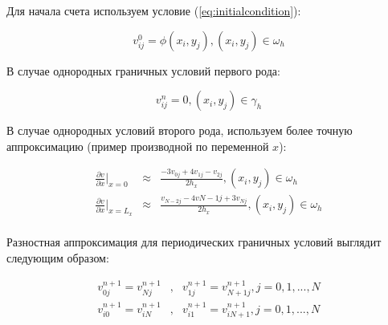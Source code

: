 \documentclass[12pt,a4paper]{scrartcl}
\begin{document}
Для начала счета используем условие (\ref{eq:initialcondition}):

\begin{equation}
    \label{eq:begincalc}
        v_{ij}^0 = \phi(x_i,y_j), (x_i,y_j) \in \omega_h
\end{equation}

В случае однородных граничных условий первого рода:

\begin{equation}
    \label{eq:secondtype}
        v_{ij}^n = 0, (x_i,y_j) \in \gamma_h
\end{equation}

В случае однородных условий второго рода, используем более точную аппроксимацию (пример производной по переменной $x$):


\begin{equation}
    \label{eq:consistentsecond}
    \begin{array}{lcl}
        \frac{\partial v}{\partial x}|_{x = 0} & \approx & \frac{-3v_{0j} + 4v_{1j} - v_{2j}}{2h_x}, (x_i, y_j) \in \omega_h \\
        \frac{\partial v}{\partial x}|_{x = L_x} & \approx & \frac{v_{N-2j} - 4v{N-1j} + 3v_{Nj}}{2h_x}, (x_i, y_j) \in \omega_h \\
    \end{array}
\end{equation}

Разностная аппроксимация для периодических граничных условий выглядит следующим образом:

\begin{equation}
    \label{eq:periodicapprox}
    \begin{array}{lcl}
        v_{0j}^{n+1} = v_{Nj}^{n+1} & , & v_{1j}^{n+1} = v_{N+1j}^{n+1},j=0,1,...,N \\
        v_{i0}^{n+1} = v_{iN}^{n+1} & , & v_{i1}^{n+1} = v_{iN+1}^{n+1},j=0,1,...,N \\
    \end{array}
\end{equation}
      
\end{document}
